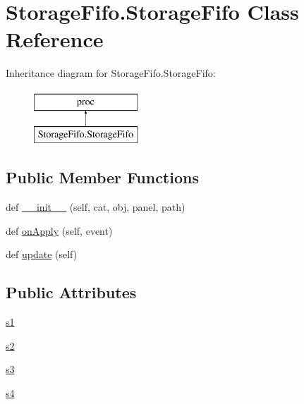 \hypertarget{classStorageFifo_1_1StorageFifo}{}\section{Storage\+Fifo.\+Storage\+Fifo Class Reference}
\label{classStorageFifo_1_1StorageFifo}
Inheritance diagram for Storage\+Fifo.\+Storage\+Fifo\+:\begin{figure}[H]
\begin{center}
\leavevmode
\includegraphics[height=2.000000cm]{classStorageFifo_1_1StorageFifo}
\end{center}
\end{figure}
\subsection*{Public Member Functions}
\begin{DoxyCompactItemize}
\item 
def \hyperlink{classStorageFifo_1_1StorageFifo_a7ee1fe240661a6d0ad47bcdb866dabba}{\+\_\+\+\_\+init\+\_\+\+\_\+} (self, cat, obj, panel, path)
\item 
def \hyperlink{classStorageFifo_1_1StorageFifo_a7fa51672518fefda7102ec998203508f}{on\+Apply} (self, event)
\item 
def \hyperlink{classStorageFifo_1_1StorageFifo_a6f95bfe2c70677ea813f3a708689686d}{update} (self)
\end{DoxyCompactItemize}
\subsection*{Public Attributes}
\begin{DoxyCompactItemize}
\item 
\hyperlink{classStorageFifo_1_1StorageFifo_af5f69dc80cba7f4f1a2407d365d71b13}{s1}
\item 
\hyperlink{classStorageFifo_1_1StorageFifo_ac8ae47a5852b5eac23b0cefa7d335c13}{s2}
\item 
\hyperlink{classStorageFifo_1_1StorageFifo_ae1aec7880da6f8a9dc51f46db70e6d0b}{s3}
\item 
\hyperlink{classStorageFifo_1_1StorageFifo_a6dbf6622f309aab462553f1bcc4ae8ad}{s4}
\end{DoxyCompactItemize}


